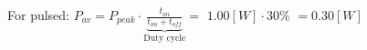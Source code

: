 \documentclass[preview]{standalone}
\begin{document}
\begin{center}
For pulsed: $P_{av} = P_{peak} \cdot $$\underbrace{\frac{t_{on}}{t_{on}+t_{off}}}_{\text{Duty cycle}}=$ $1.00 [W] \cdot $$30 \%$ $=$$0.30 [W]$
\end{center}
\end{document}
